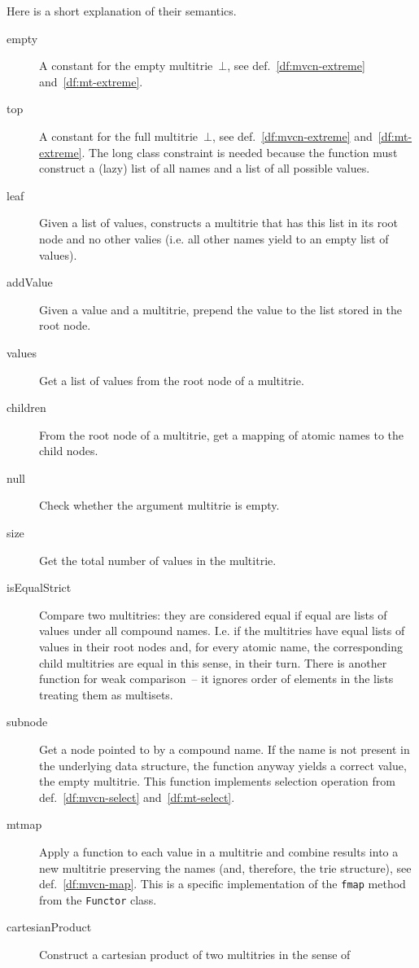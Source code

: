 \documentclass{article}
\theoremstyle{definition}
\begin{document}
Here is a short explanation of their semantics.
\begin{description}
\item [empty]
  A constant for the empty multitrie~$\bot$, see def.~\ref{df:mvcn-extreme}
  and~\ref{df:mt-extreme}.
\item [top]
  A constant for the full multitrie~$\bot$, see def.~\ref{df:mvcn-extreme}
  and~\ref{df:mt-extreme}.  The long class constraint is needed because the
  function must construct a (lazy) list of all names and a list of all possible
  values.
\item [leaf] Given a list of values, constructs a multitrie that has this list
  in its root node and no other valies (i.e. all other names yield to an empty
  list of values).
\item [addValue]
  Given a value and a multitrie, prepend the value to the list stored in the
  root node.
\item [values]
  Get a list of values from the root node of a multitrie.
\item [children]
  From the root node of a multitrie, get a mapping of atomic names to the
  child nodes.
\item [null]
  Check whether the argument multitrie is empty.
\item [size]
  Get the total number of values in the multitrie.
\item [isEqualStrict]
  Compare two multitries: they are considered equal if equal are lists of
  values under all compound names. I.e. if the multitries have equal lists
  of values in their root nodes and, for every atomic name, the corresponding
  child multitries are equal in this sense, in their turn. There is another
  function for weak comparison~-- it ignores order of elements in the lists
  treating them as multisets.
\item [subnode]
  Get a node pointed to by a compound name. If the name is not present in the
  underlying data structure, the function anyway yields a correct value, the
  empty multitrie. This function implements selection operation from
  def.~\ref{df:mvcn-select} and~\ref{df:mt-select}.
\item [mtmap]
  Apply a function to each value in a multitrie and combine results into
  a new multitrie preserving the names (and, therefore, the trie structure),
  see def.~\ref{df:mvcn-map}.
  This is a specific implementation of the \lstinline{fmap} method from the
  \lstinline{Functor} class.
\item [cartesianProduct]
  Construct a cartesian product of two multitries in the sense of

\end{description}
\end{document}
